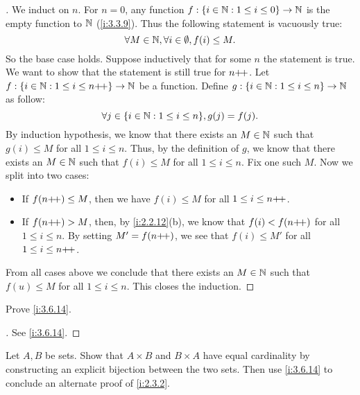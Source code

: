 \begin{proof}[]
  We induct on \(n\).
  For \(n = 0\), any function \(f : \left\lbrace i \in \mathbb{N} : 1 \leq i \leq 0\right\rbrace \to \mathbb{N}\) is the empty function to \(\mathbb{N}\) (\cref{i:3.3.9}).
  Thus the following statement is vacuously true:
  \[
    \forall M \in \mathbb{N}, \forall i \in \emptyset, f(i) \leq M.
  \]
  So the base case holds.
  Suppose inductively that for some \(n\) the statement is true.
  We want to show that the statement is still true for \(n{+}\!{+}\).
  Let \(f : \left\lbrace i \in \mathbb{N} : 1 \leq i \leq n{+}\!{+}\right\rbrace \to \mathbb{N}\) be a function.
  Define \(g : \left\lbrace i \in \mathbb{N} : 1 \leq i \leq n\right\rbrace \to \mathbb{N}\) as follow:
  \[
    \forall j \in \set{i \in \N : 1 \leq i \leq n}, g(j) = f(j).
  \]
  By induction hypothesis, we know that there exists an \(M \in \mathbb{N}\) such that \(g(i) \leq M\) for all \(1 \leq i \leq n\).
  Thus, by the definition of \(g\), we know that there exists an \(M \in \mathbb{N}\) such that \(f(i) \leq M\) for all \(1 \leq i \leq n\).
  Fix one such \(M\).
  Now we split into two cases:
  \begin{itemize}
    \item If \(f(n{+}\!{+}) \leq M\), then we have \(f(i) \leq M\) for all \(1 \leq i \leq n{+}\!{+}\).
    \item If \(f(n{+}\!{+}) > M\), then, by \cref{i:2.2.12}(b), we know that \(f(i) < f(n{+}\!{+})\) for all \(1 \leq i \leq n\).
          By setting \(M' = f(n{+}\!{+})\), we see that \(f(i) \leq M'\) for all \(1 \leq i \leq n{+}\!{+}\).
  \end{itemize}
  From all cases above we conclude that there exists an \(M \in \mathbb{N}\) such that \(f(u) \leq M\) for all \(1 \leq i \leq n\).
  This closes the induction.
\end{proof}

\begin{ex}\label{i:ex:3.6.4}
  Prove \cref{i:3.6.14}.
\end{ex}

\begin{proof}[]
  See \cref{i:3.6.14}.
\end{proof}

\begin{ex}\label{i:ex:3.6.5}
  Let \(A, B\) be sets.
  Show that \(A \times B\) and \(B \times A\) have equal cardinality by constructing an explicit bijection between the two sets.
  Then use \cref{i:3.6.14} to conclude an alternate proof of \cref{i:2.3.2}.
\end{ex}

